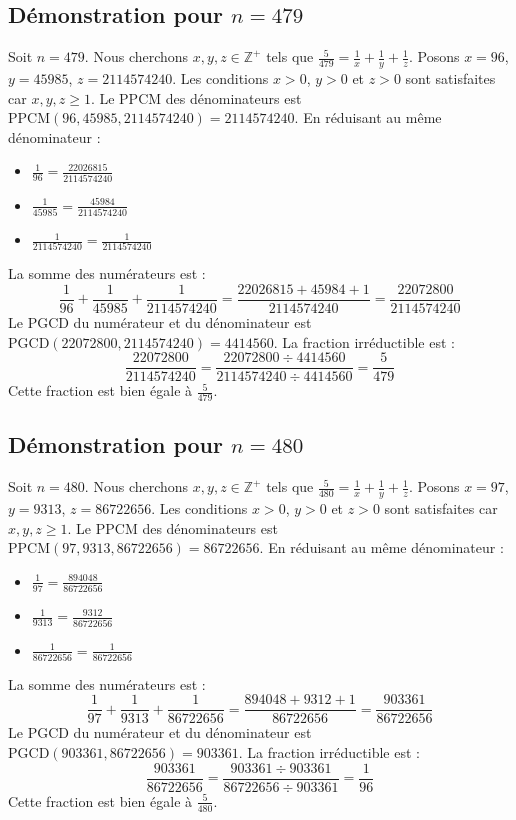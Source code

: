 \documentclass[11pt,a4paper]{article}
\begin{document}
\subsection{Démonstration pour $n = 479$}
Soit $n = 479$. Nous cherchons $x, y, z \in \mathbb{Z}^{+}$ tels que $\frac{5}{479} = \frac{1}{x} + \frac{1}{y} + \frac{1}{z}$.
Posons $x = 96$, $y = 45985$, $z = 2114574240$.
Les conditions $x > 0$, $y > 0$ et $z > 0$ sont satisfaites car $x, y, z \geq 1$.
Le PPCM des dénominateurs est $\text{PPCM}(96, 45985, 2114574240) = 2114574240$.
En réduisant au même dénominateur :
\begin{itemize}
    \item $\frac{1}{96} = \frac{22026815}{2114574240}$
    \item $\frac{1}{45985} = \frac{45984}{2114574240}$
    \item $\frac{1}{2114574240} = \frac{1}{2114574240}$
\end{itemize}
La somme des numérateurs est :
$$ \frac{1}{96} + \frac{1}{45985} + \frac{1}{2114574240} = \frac{22026815 + 45984 + 1}{2114574240} = \frac{22072800}{2114574240} $$
Le PGCD du numérateur et du dénominateur est $\text{PGCD}(22072800, 2114574240) = 4414560$.
La fraction irréductible est :
$$ \frac{22072800}{2114574240} = \frac{22072800 \div 4414560}{2114574240 \div 4414560} = \frac{5}{479} $$
Cette fraction est bien égale à $\frac{5}{479}$.

\subsection{Démonstration pour $n = 480$}
Soit $n = 480$. Nous cherchons $x, y, z \in \mathbb{Z}^{+}$ tels que $\frac{5}{480} = \frac{1}{x} + \frac{1}{y} + \frac{1}{z}$.
Posons $x = 97$, $y = 9313$, $z = 86722656$.
Les conditions $x > 0$, $y > 0$ et $z > 0$ sont satisfaites car $x, y, z \geq 1$.
Le PPCM des dénominateurs est $\text{PPCM}(97, 9313, 86722656) = 86722656$.
En réduisant au même dénominateur :
\begin{itemize}
    \item $\frac{1}{97} = \frac{894048}{86722656}$
    \item $\frac{1}{9313} = \frac{9312}{86722656}$
    \item $\frac{1}{86722656} = \frac{1}{86722656}$
\end{itemize}
La somme des numérateurs est :
$$ \frac{1}{97} + \frac{1}{9313} + \frac{1}{86722656} = \frac{894048 + 9312 + 1}{86722656} = \frac{903361}{86722656} $$
Le PGCD du numérateur et du dénominateur est $\text{PGCD}(903361, 86722656) = 903361$.
La fraction irréductible est :
$$ \frac{903361}{86722656} = \frac{903361 \div 903361}{86722656 \div 903361} = \frac{1}{96} $$
Cette fraction est bien égale à $\frac{5}{480}$.
\end{document}
